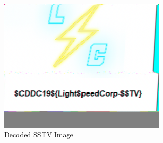 		\begin{figure}[!htbp]\centering
			\includegraphics[width=80mm]{figures/sstv/SSTV.png} \vspace{5mm}
			\caption{Decoded SSTV Image}
		\end{figure}











